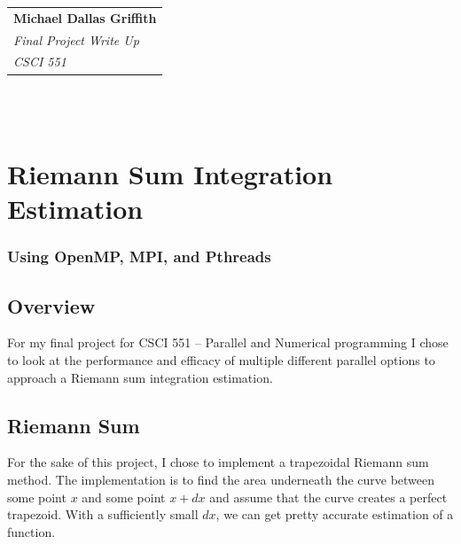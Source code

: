 \documentclass{article}
\begin{document}
	\null\hfill\begin{tabular}[t]{l@{}}
	\textbf{Michael Dallas Griffith} \\
	\textit{Final Project Write Up} \\
	\textit{CSCI 551}\\
	\end{tabular} \\ \\
\section*{Riemann Sum Integration Estimation}
\subsubsection*{Using OpenMP, MPI, and Pthreads}
\subsection*{Overview}
For my final project for CSCI 551 -- Parallel and Numerical programming I chose to look at the performance and efficacy of multiple different parallel options to approach a Riemann sum integration estimation.
\subsection*{Riemann Sum}
For the sake of this project, I chose to implement a trapezoidal Riemann sum method. The implementation is to find the area underneath the curve between some point $x$ and some point $x+dx$ and assume that the curve creates a perfect trapezoid. With a sufficiently small $dx$, we can get pretty accurate estimation of a function.
\end{document}
